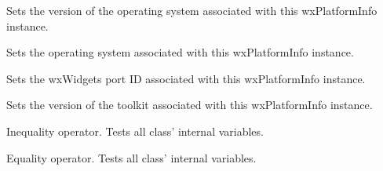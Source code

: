 
Sets the version of the operating system associated with this wxPlatformInfo instance.



\label{wxplatforminfosetoperatingsystemid}


Sets the operating system associated with this wxPlatformInfo instance.



\label{wxplatforminfosetportid}


Sets the wxWidgets port ID associated with this wxPlatformInfo instance.



\label{wxplatforminfosettoolkitversion}


Sets the version of the toolkit associated with this wxPlatformInfo instance.



\label{wxplatforminfooperatorunknown}


Inequality operator. Tests all class' internal variables.


\label{wxplatforminfooperatorequal}


Equality operator. Tests all class' internal variables.

